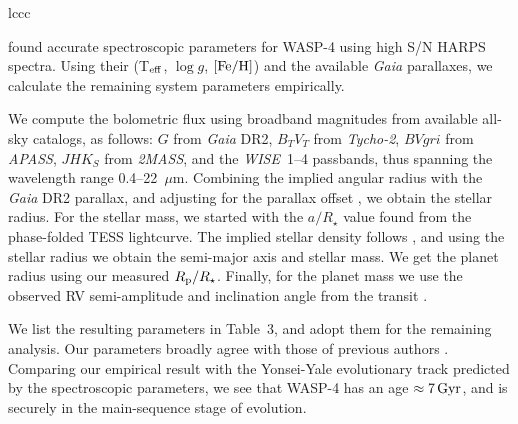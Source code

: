 \documentclass[12pt,twocolumn,tighten]{aastex62}
\begin{document}
\begin{deluxetable}{lccc}

\end{deluxetable}

\citet{doyle_accurate_2013} found accurate spectroscopic parameters
for WASP-4 using high S/N HARPS spectra.  Using their (T$_{\rm eff}$,
$\log g$, $[{\rm Fe/H}]$) and the available {\it Gaia} parallaxes, we
calculate the remaining system parameters empirically.

We compute the bolometric flux using broadband magnitudes from
available all-sky catalogs, as follows: $G$ from {\it Gaia\/} DR2,
$B_T V_T$ from {\it Tycho-2}, $BVgri$ from {\it APASS}, $JHK_S$ from {\it
2MASS}, and the {\it WISE}~1--4 passbands, thus spanning the
wavelength range 0.4--22~$\mu$m.  Combining the implied angular radius
with the {\it Gaia} DR2 parallax, and adjusting for the parallax
offset \citep{stassun_evidence_2018}, we obtain the stellar radius.
For the stellar mass, we started with the $a/R_\star$ value found from
the phase-folded TESS lightcurve.  The implied stellar density follows
\citep{seager_unique_2003}, and using the stellar radius we obtain the
semi-major axis and stellar mass.  We get the planet radius using our
measured $R_{\rm p}/R_\star$.  Finally, for the planet mass we use the
observed RV semi-amplitude and inclination angle from the transit
\citep{triaud_spin-orbit_2010}.

We list the resulting parameters in Table~3, and adopt them for the
remaining analysis.  Our parameters broadly agree with those of previous
authors
\citep{wilson_wasp-4b_2008,gillon_discovery_2009,winn_transit_2009,southworth_homogeneous_2011,petrucci_no_2013}.
Comparing our empirical result with the Yonsei-Yale evolutionary track
predicted by the spectroscopic parameters, we see that WASP-4 has an
age $\approx 7\,{\rm Gyr}$, and is securely in the main-sequence stage
of evolution.
\end{document}

